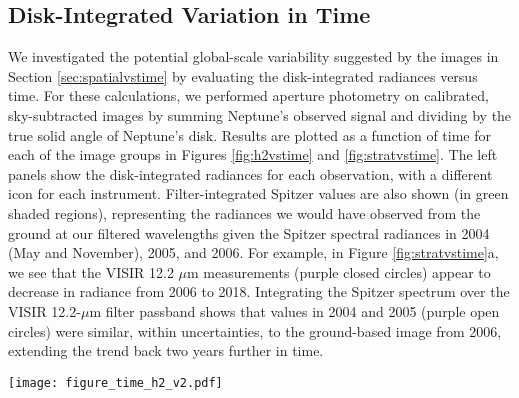 \documentclass[twocolumn,10pt]{aastex631}
\begin{document}
\subsection{Disk-Integrated Variation in Time}\label{sec:diskintvstime}
We investigated the potential global-scale variability suggested by the images in Section \ref{sec:spatialvstime} by evaluating the disk-integrated radiances versus time.  For these calculations, we performed aperture photometry on calibrated, sky-subtracted images by summing Neptune's observed signal and dividing by the true solid angle of Neptune's disk.  Results are plotted as a function of time for each of the image groups in Figures \ref{fig:h2vstime} and \ref{fig:stratvstime}. The left panels show the disk-integrated radiances for each observation, with a different icon for each instrument. Filter-integrated Spitzer values are also shown (in green shaded regions), representing the radiances we would have observed from the ground at our filtered wavelengths given the Spitzer spectral radiances in 2004 (May and November), 2005, and 2006. For example, in Figure \ref{fig:stratvstime}a, we see that the VISIR 12.2 $\mu$m measurements (purple closed circles) appear to decrease in radiance from 2006 to 2018. Integrating the Spitzer spectrum over the VISIR 12.2-$\mu$m filter passband shows that values in 2004 and 2005 (purple open circles) were similar, within uncertainties, to the ground-based image from 2006, extending the trend back two years further in time. 

\begin{figure*}
    \centering
    \texttt{[image: figure\_time\_h2\_v2.pdf]}
    \caption{Disk-integrated radiances versus time for all hydrogen-sensing images (17--25 $\mu$m) along with the 10--11 $\mu$m images. Symbols correspond to different instruments and filters as indicated by the key, with error bars of 30\%. Spitzer filter-integrated equivalent values are also shown as smaller, open symbols in the green shaded regions of 2004, 2005, and 2006, with error bars of 7\%. a) The absolute radiances for each observation versus time, which span a wide range of values given differences in filter wavelengths.  Note that COMICS 24.5 $\mu$m and the T-ReCS 10.4 $\mu$m are shown at 1/10 and 10 $\times$ their actual values, respectively, for clarity.  b) The relative radiance as a ratio to Spitzer observations in 2005 (indicated by the + sign).  As a ratio, the wavelength-dependent differences are essentially removed, and the relative differences of the group over time become evident. The images show no significant disk-integrated trends in time beyond the uncertainties.}
    \label{fig:h2vstime}
\end{figure*}
\end{document}
